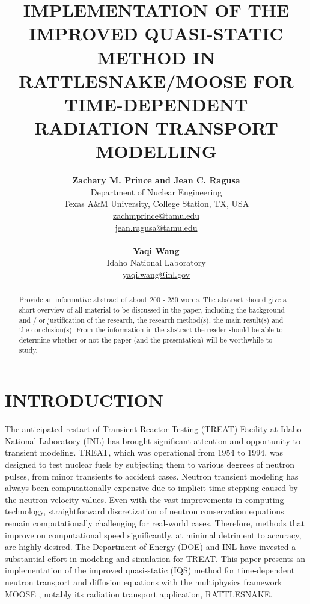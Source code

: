 \documentclass[12pt]{article}
\title{IMPLEMENTATION OF THE IMPROVED QUASI-STATIC METHOD IN RATTLESNAKE/MOOSE FOR TIME-DEPENDENT RADIATION TRANSPORT MODELLING}
\author{ 
  \textbf{Zachary M. Prince and Jean C. Ragusa} \\
  Department of Nuclear Engineering \\
  Texas A\&M University, College Station, TX, USA\\
  \href{mailto:zachmprince@tamu.edu}{zachmprince@tamu.edu}\\
  \href{mailto:jean.ragusa@tamu.edu}{jean.ragusa@tamu.edu}\\
  \\                       %
  \textbf{Yaqi Wang} \\
   Idaho National Laboratory \\
  \href{mailto:yaqi.wang@inl.gov}{yaqi.wang@inl.gov} 
}
\begin{document}


\maketitle

\begin{abstract}
  Provide an informative abstract of about 200 - 250 words. The abstract should give a short overview of all material to be discussed in the paper, including the background and / or justification of the research, the research method(s), the main result(s) and the conclusion(s). From the information in the abstract the reader should be able to determine whether or not the paper (and the presentation) will be worthwhile to study.
\end{abstract}


%
\section{INTRODUCTION}
\label{sect::intro}

The anticipated restart of Transient Reactor Testing (TREAT) Facility at Idaho National Laboratory (INL) has brought significant attention and opportunity to transient modeling.  TREAT, which was operational from 1954 to 1994, was designed to test nuclear fuels by subjecting them to various degrees of neutron pulses, from minor transients to accident cases.  Neutron transient modeling has always been computationally expensive due to implicit time-stepping caused by the neutron velocity values. Even with the vast improvements in computing technology, straightforward discretization of neutron conservation equations remain computationally challenging for real-world cases.  Therefore, methods that improve on computational speed significantly, at minimal detriment to accuracy, are highly desired. The Department of Energy (DOE) and INL have invested a substantial effort in modeling and simulation for TREAT.  This paper presents an implementation of the improved quasi-static (IQS) method for time-dependent neutron transport and diffusion equations with the multiphysics framework MOOSE \cite{moose}, notably its radiation transport application, RATTLESNAKE.
\end{document}
